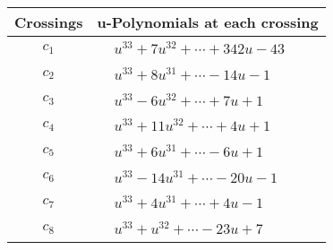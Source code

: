 \documentclass[1p]{elsarticle_modified}
\theoremstyle{definition}
\begin{document}
\begin{tabular}{m{50pt}|m{274pt}}
Crossings & \hspace{64pt}u-Polynomials at each crossing \\
\hline $$\begin{aligned}c_{1}\end{aligned}$$&$\begin{aligned}
&u^{33}+7 u^{32}+\cdots+342 u-43
\end{aligned}$\\
\hline $$\begin{aligned}c_{2}\end{aligned}$$&$\begin{aligned}
&u^{33}+8 u^{31}+\cdots-14 u-1
\end{aligned}$\\
\hline $$\begin{aligned}c_{3}\end{aligned}$$&$\begin{aligned}
&u^{33}-6 u^{32}+\cdots+7 u+1
\end{aligned}$\\
\hline $$\begin{aligned}c_{4}\end{aligned}$$&$\begin{aligned}
&u^{33}+11 u^{32}+\cdots+4 u+1
\end{aligned}$\\
\hline $$\begin{aligned}c_{5}\end{aligned}$$&$\begin{aligned}
&u^{33}+6 u^{31}+\cdots-6 u+1
\end{aligned}$\\
\hline $$\begin{aligned}c_{6}\end{aligned}$$&$\begin{aligned}
&u^{33}-14 u^{31}+\cdots-20 u-1
\end{aligned}$\\
\hline $$\begin{aligned}c_{7}\end{aligned}$$&$\begin{aligned}
&u^{33}+4 u^{31}+\cdots+4 u-1
\end{aligned}$\\
\hline $$\begin{aligned}c_{8}\end{aligned}$$&$\begin{aligned}
&u^{33}+u^{32}+\cdots-23 u+7
\end{aligned}$\\

\end{tabular}
\end{document}
